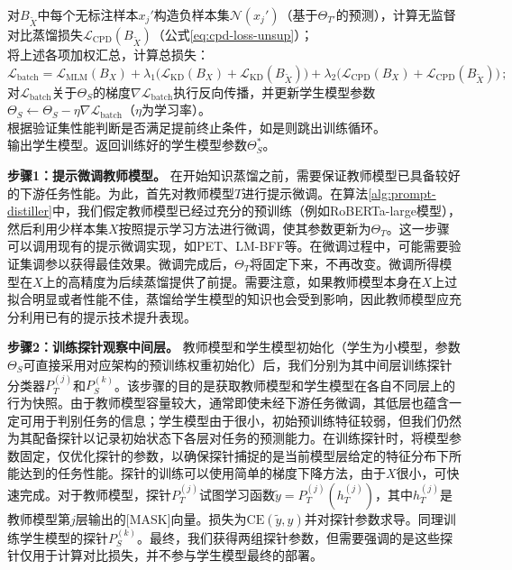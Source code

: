 \documentclass[../main.tex]{subfiles}
\begin{document}
\begin{algorithm}[t]
{{			对$B_{\tilde{X}}$中每个无标注样本$x_j'$构造负样本集$\mathcal{N}(x_j')$（基于$\Theta_{T'}$的预测），计算无监督对比蒸馏损失$\mathcal{L}_{\text{CPD}}(B_{\tilde{X}})$（公式\eqref{eq:cpd-loss-unsup}）；\\
			将上述各项加权汇总，计算总损失：
			$
				\mathcal{L}_{\text{batch}} = \mathcal{L}_{\text{MLM}}(B_X) + \lambda_1 \Big( \mathcal{L}_{\text{KD}}(B_X) + \mathcal{L}_{\text{KD}}(B_{\tilde{X}}) \Big) + \lambda_2 \Big( \mathcal{L}_{\text{CPD}}(B_X) + \mathcal{L}_{\text{CPD}}(B_{\tilde{X}}) \Big)\,;
			$
			对$\mathcal{L}_{\text{batch}}$关于$\Theta_S$的梯度$\nabla \mathcal{L}_{\text{batch}}$执行反向传播，并更新学生模型参数$\Theta_S \leftarrow \Theta_S - \eta \nabla \mathcal{L}_{\text{batch}}$（$\eta$为学习率）。\\
		} %
		根据验证集性能判断是否满足提前终止条件，如是则跳出训练循环。\\
	} %
	输出学生模型。返回训练好的学生模型参数$\Theta_S^*$。
\end{algorithm}

\textbf{步骤1：提示微调教师模型。} 在开始知识蒸馏之前，需要保证教师模型已具备较好的下游任务性能。为此，首先对教师模型$T$进行提示微调。在算法\ref{alg:prompt-distiller}中，我们假定教师模型已经过充分的预训练（例如RoBERTa-large模型），然后利用少样本集$X$按照提示学习方法进行微调，使其参数更新为$\Theta_T$。这一步骤可以调用现有的提示微调实现，如PET、LM-BFF等。在微调过程中，可能需要验证集调参以获得最佳效果。微调完成后，$\Theta_T$将固定下来，不再改变。微调所得模型在$X$上的高精度为后续蒸馏提供了前提。需要注意，如果教师模型本身在$X$上过拟合明显或者性能不佳，蒸馏给学生模型的知识也会受到影响，因此教师模型应充分利用已有的提示技术提升表现。

\textbf{步骤2：训练探针观察中间层。} 教师模型和学生模型初始化（学生为小模型，参数$\Theta_S$可直接采用对应架构的预训练权重初始化）后，我们分别为其中间层训练探针分类器$P_T^{(j)}$和$P_S^{(k)}$。该步骤的目的是获取教师模型和学生模型在各自不同层上的行为快照。由于教师模型容量较大，通常即使未经下游任务微调，其低层也蕴含一定可用于判别任务的信息；学生模型由于很小，初始预训练特征较弱，但我们仍然为其配备探针以记录初始状态下各层对任务的预测能力。在训练探针时，将模型参数固定，仅优化探针的参数，以确保探针捕捉的是当前模型层给定的特征分布下所能达到的任务性能。探针的训练可以使用简单的梯度下降方法，由于$X$很小，可快速完成。对于教师模型，探针$P_T^{(j)}$试图学习函数$\tilde{y}=P_T^{(j)}(h_T^{(j)})$，其中$h_T^{(j)}$是教师模型第$j$层输出的[MASK]向量。损失为$\text{CE}(\tilde{y}, y)$并对探针参数求导。同理训练学生模型的探针$P_S^{(k)}$。最终，我们获得两组探针参数，但需要强调的是这些探针仅用于计算对比损失，并不参与学生模型最终的部署。
\end{document}
